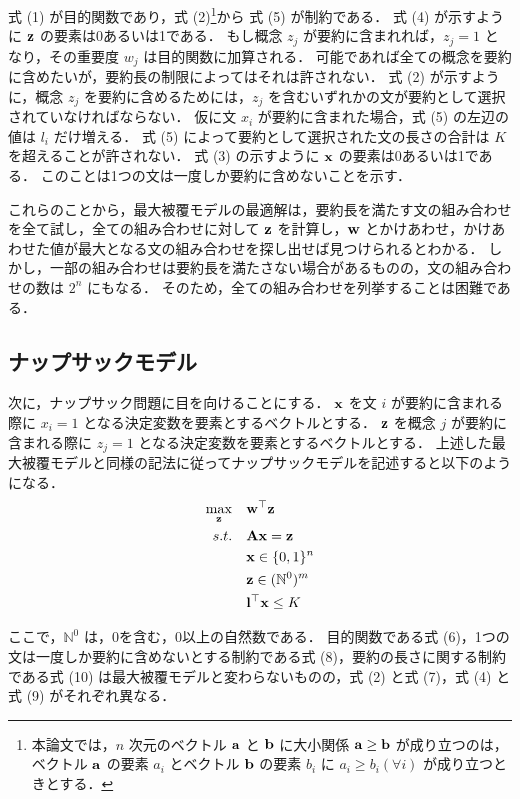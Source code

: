 \documentclass[japanese]{jnlp_1.4}
\begin{document}
式 (1) が目的関数であり，式 (2)\footnote{本論文では，$ n $ 次元のベクトル $ {\bf a} $ と $ {\bf b} $ に大小関係 $ {\bf a} \geq {\bf b} $ が成り立つのは，ベクトル $ {\bf a} $ の要素 $ a_{i} $ とベクトル $ {\bf b} $ の要素 $ b_{i} $ に $ a_{i} \geq b_{i} ( \forall i ) $ が成り立つときとする．}から 式 (5) が制約である．
式 (4) が示すように $ {\bf z} $ の要素は0あるいは1である．
もし概念 $ z_{j} $ が要約に含まれれば，$ z_{j} = 1 $ となり，その重要度 $ w_{j} $ は目的関数に加算される．
可能であれば全ての概念を要約に含めたいが，要約長の制限によってはそれは許されない．
式 (2) が示すように，概念 $ z_{j} $ を要約に含めるためには，$ z_{j} $ を含むいずれかの文が要約として選択されていなければならない．
仮に文 $ x_{i} $ が要約に含まれた場合，式 (5) の左辺の値は $ l_{i} $ だけ増える．
式 (5) によって要約として選択された文の長さの合計は $ K $ を超えることが許されない．
式 (3) の示すように $ {\bf x} $ の要素は0あるいは1である．
このことは1つの文は一度しか要約に含めないことを示す．

これらのことから，最大被覆モデルの最適解は，要約長を満たす文の組み合わせを全て試し，全ての組み合わせに対して $ {\bf z} $ を計算し，$ {\bf w} $ とかけあわせ，かけあわせた値が最大となる文の組み合わせを探し出せば見つけられるとわかる．
しかし，一部の組み合わせは要約長を満たさない場合があるものの，文の組み合わせの数は $ 2^{n} $ にもなる．
そのため，全ての組み合わせを列挙することは困難である．



\subsection{ナップサックモデル}

次に，ナップサック問題に目を向けることにする．
$ {\bf x} $ を文 $ i $ が要約に含まれる際に $ x_{i} = 1 $ となる決定変数を要素とするベクトルとする．
$ {\bf z} $ を概念 $ j $ が要約に含まれる際に $ z_{j} = 1 $ となる決定変数を要素とするベクトルとする．
上述した最大被覆モデルと同様の記法に従ってナップサックモデルを記述すると以下のようになる．
\begin{align}
\max_{{\bf z}} & \quad {\bf w}^{\top} {\bf z} \\
s.t. & \quad  {\bf Ax} = {\bf z} \\
& \quad {\bf x} \in \{0, 1\}^{n} \\
& \quad {\bf z} \in ( \mathbb{N}^{0} )^{m} \\
& \quad {\bf l}^{\top} {\bf x} \leq K
\end{align}

ここで，$ \mathbb{N}^{0} $ は，0を含む，0以上の自然数である．
目的関数である式 (6)，1つの文は一度しか要約に含めないとする制約である式 (8)，要約の長さに関する制約である式 (10) は最大被覆モデルと変わらないものの，式 (2) と式 (7)，式 (4) と式 (9) がそれぞれ異なる．
\end{document}
